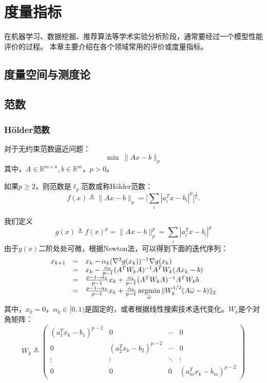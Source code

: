 \chapter{度量指标}
在机器学习、数据挖掘、推荐算法等学术实验分析阶段，通常要经过一个模型性能评价的过程。
本章主要介绍在各个领域常用的评价或度量指标。

\ornamento

\section{度量空间与测度论}
\section{范数}
\subsection{H\"{o}lder范数}
对于无约束范数逼近问题：
\begin{equation}\label{eq:normmin}
    \min~\|Ax - b\|_p
\end{equation}
其中，$A\in \mathbb{R}^{m\times n}, b\in \mathbb{R}^m$，$p>0$。

如果$p\ge 2$，则范数是$\ell_p$范数或称H\"{o}lder范数：
\begin{equation}
    f(x) \triangleq \|Ax - b\|_p = \Big[\sum\limits_i |a_i^T x - b_i|^p\Big]^\frac{1}{p}.
\end{equation}

我们定义
\[
    g(x) \triangleq f(x)^p = \|Ax - b\|_p^p = \sum\limits_i |a_i^T x - b_i|^p
\]
由于$g(x)$二阶处处可微，根据Newton法，可以得到下面的迭代序列：
\begin{equation}
    \begin{array}{lll}
      x_{k+1} & = & x_k -\alpha_k (\nabla^2 g(x_k))^{-1} \nabla g(x_k) \\
       & = & x_k - \frac{\alpha_k}{p-1} (A^T W_k A)^{-1} A^T W_k (A x_k - b) \\
       & = & \frac{p - 1 - \alpha_k}{p-1} x_k + \frac{\alpha_k}{p-1} (A^T W_k A)^{-1} A^T W_k b \\
       & = & \frac{p - 1 - \alpha_k}{p-1} x_k + \frac{\alpha_k}{p-1} \operatorname*{\mathrm{\arg\!\min}}\limits_{\bar{\omega}} \|W_k^{1/2}(A \bar{\omega} - b)\|_2
    \end{array}
\end{equation}
其中，$x_0 = 0$，$\alpha_k\in [0,1)$是固定的，或者根据线性搜索技术迭代变化。$W_k$是个对角矩阵：
\begin{equation}
    W_k \triangleq
    \begin{pmatrix}
        (a_1^T x_k - b_1)^{p-2} & 0 & \cdots & 0 \\
        0 & (a_2^T x_k - b_2)^{p-2} & \cdots & 0 \\
        \vdots & \vdots & \ddots & \vdots \\
        0 & 0 & 0 & (a_m^T x_k - b_m)^{p-2}
    \end{pmatrix}
\end{equation}

